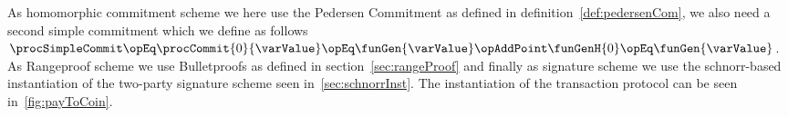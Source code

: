 As homomorphic commitment scheme we here use the Pedersen Commitment as defined in definition~\ref{def:pedersenCom}, we also need a second simple commitment which we define as follows
$\procSimpleCommit \opEq \procCommit{0}{\varValue} \opEq \funGen{\varValue} \opAddPoint \funGenH{0} \opEq \funGen{\varValue}$. As Rangeproof scheme we use Bulletproofs as defined in
section~\ref{sec:rangeProof} and finally as signature scheme we use the schnorr-based instantiation of the two-party signature scheme seen in~\ref{sec:schnorrInst}. The instantiation of the
transaction protocol can be seen in~\ref{fig:payToCoin}.
\begin{figure}
    \begin{center}
\end{center}
\end{figure}
